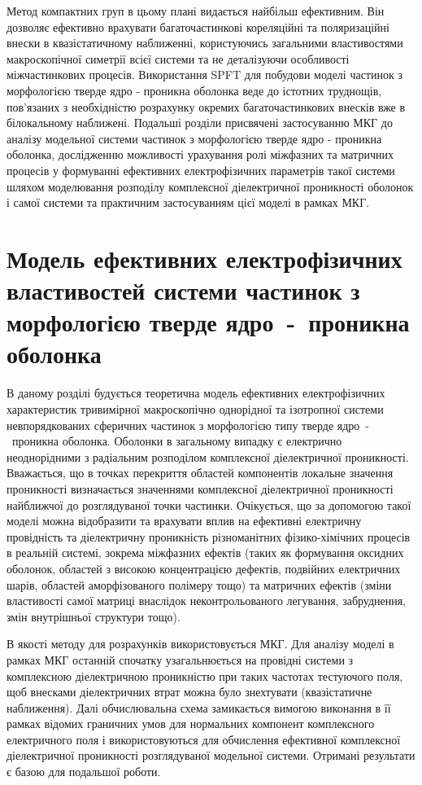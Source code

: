 \documentclass[14pt,twoside]{vakthesis}
\begin{document}
Метод компактних груп в цьому плані видається найбільш ефективним. Він дозволяє ефективно врахувати  багаточастинкові кореляційні та поляризаційні внески в квазістатичному наближенні, користуючись загальними властивостями макроскопічної симетрії всієї системи та не деталізуючи особливості міжчастинкових процесів. Використання SPFT для побудови моделі частинок з морфологією тверде ядро - проникна оболонка веде до істотних труднощів, пов'язаних з необхідністю розрахунку окремих багаточастинкових внесків вже в білокальному наближені.
Подальші розділи присвячені застосуванню МКГ до аналізу модельної системи частинок з морфологією тверде ядро - проникна оболонка, дослідженню можливості урахування ролі міжфазних та матричних процесів у формуванні ефективних електрофізичних параметрів такої системи шляхом моделювання розподілу комплексної діелектричної проникності оболонок і самої системи та практичним застосуванням цієї моделі в рамках МКГ.


\chapter{Модель ефективних електрофізичних властивостей системи частинок з морфологією тверде ядро~-~проникна оболонка}\label{sec:core-shell}

В даному розділі будується теоретична модель ефективних електрофізичних характеристик тривимірної макроскопічно однорідної та ізотропної системи невпорядкованих сферичних частинок з морфологією типу тверде ядро~-~проникна оболонка.
Оболонки в загальному випадку є електрично неоднорідними з радіальним розподілом комплексної діелектричної проникності. Вважається, що в точках перекриття областей компонентів локальне значення  проникності визначається значеннями комплексної діелектричної проникності найближчої до розглядуваної точки  частинки.
Очікується, що за допомогою такої моделі можна  відобразити та врахувати вплив на ефективні електричну провідність та діелектричну проникність різноманітних фізико-хімічних процесів в реальній системі, зокрема міжфазних ефектів (таких як формування оксидних оболонок, областей з високою концентрацією дефектів, подвійних електричних шарів, областей аморфізованого полімеру тощо) та матричних ефектів (зміни властивості самої матриці внаслідок неконтрольованого легування, забруднення, змін внутрішньої структури тощо).

В якості методу для розрахунків використовується МКГ. Для аналізу моделі в рамках МКГ останній спочатку узагальнюється на провідні системи з комплексною діелектричною проникністю при таких частотах тестуючого поля, щоб внесками діелектричних втрат можна було знехтувати (квазістатичне наближення). Далі обчислювальна схема замикається вимогою виконання в її рамках відомих граничних умов для нормальних компонент комплексного електричного поля і використовуються для обчислення ефективної комплексної діелектричної проникності  розглядуваної модельної системи. Отримані результати є базою для подальшої роботи.
\end{document}
